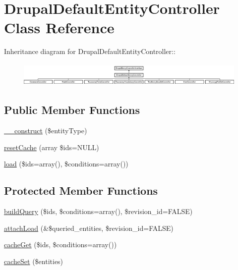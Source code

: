 \hypertarget{classDrupalDefaultEntityController}{
\section{DrupalDefaultEntityController Class Reference}
\label{classDrupalDefaultEntityController}
}
Inheritance diagram for DrupalDefaultEntityController::\begin{figure}[H]
\begin{center}
\leavevmode
\includegraphics[height=1.20603cm]{classDrupalDefaultEntityController}
\end{center}
\end{figure}
\subsection*{Public Member Functions}
\begin{DoxyCompactItemize}
\item 
\hyperlink{classDrupalDefaultEntityController_ae25e238e38c76dc784040ae8ad9cfc9c}{\_\-\_\-construct} (\$entityType)
\item 
\hyperlink{classDrupalDefaultEntityController_a4d64a900a78ece5d4acc569000b69270}{resetCache} (array \$ids=NULL)
\item 
\hyperlink{classDrupalDefaultEntityController_a523544ab73cba6994201afa89b0fb0c7}{load} (\$ids=array(), \$conditions=array())
\end{DoxyCompactItemize}
\subsection*{Protected Member Functions}
\begin{DoxyCompactItemize}
\item 
\hyperlink{classDrupalDefaultEntityController_aaa882d053aa4e04e2816b0093b79b0f8}{buildQuery} (\$ids, \$conditions=array(), \$revision\_\-id=FALSE)
\item 
\hyperlink{classDrupalDefaultEntityController_a68735c41d2ba655a073c64983754edf7}{attachLoad} (\&\$queried\_\-entities, \$revision\_\-id=FALSE)
\item 
\hyperlink{classDrupalDefaultEntityController_ae791ed21b33704e3b315d106354959c9}{cacheGet} (\$ids, \$conditions=array())
\item 
\hyperlink{classDrupalDefaultEntityController_a5a63fa946fe3fd17b99f865553d0c74d}{cacheSet} (\$entities)
\end{DoxyCompactItemize}

